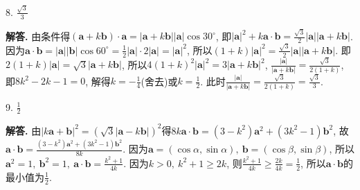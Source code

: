 \documentclass[12pt,a4paper,oneside]{ctexart}
\newenvironment{solution}{\par\noindent\textbf{解答. }}{\\\par}
\begin{document}
8. $ \frac{\sqrt{3}}{3} $
\begin{solution}
    由条件得$ (\boldsymbol{a}+k\boldsymbol{b})\cdot\boldsymbol{a}=|\boldsymbol{a}+k\boldsymbol{b}||\boldsymbol{a}|\cos 30^{\circ} $, 即$ |\boldsymbol{a}|^2+k\boldsymbol{a}\cdot\boldsymbol{b}=\frac{\sqrt{3}}{2}|\boldsymbol{a}||\boldsymbol{a}+k\boldsymbol{b}| $. 因为$ \boldsymbol{a}\cdot\boldsymbol{b}=|\boldsymbol{a}||\boldsymbol{b}|\cos 60^{\circ}=\frac{1}{2}|\boldsymbol{a}|\cdot 2|\boldsymbol{a}|=|\boldsymbol{a}|^2 $, 所以$ (1+k)|\boldsymbol{a}|^2=\frac{\sqrt{3}}{2}|\boldsymbol{a}||\boldsymbol{a}+k\boldsymbol{b}| $. 即$ 2(1+k)|\boldsymbol{a}|=\sqrt{3}|\boldsymbol{a}+k\boldsymbol{b}| $, 所以$ 4(1+k)^2|\boldsymbol{a}|^2=3|\boldsymbol{a}+k\boldsymbol{b}|^2 $, $ \frac{|\boldsymbol{a}|}{|\boldsymbol{a}+k\boldsymbol{b}|}=\frac{\sqrt{3}}{2(1+k)} $, 即$ 8k^2-2k-1=0 $, 解得$ k=-\frac{1}{4} $(舍去)或$ k=\frac{1}{2} $. 此时$ \frac{|\boldsymbol{a}|}{|\boldsymbol{a}+k\boldsymbol{b}|}=\frac{\sqrt{3}}{2(1+k)}=\frac{\sqrt{3}}{3} $.
\end{solution}

9. $ \frac{1}{2} $
\begin{solution}
    由$ |k\boldsymbol{a}+\boldsymbol{b}|^2=(\sqrt{3}|\boldsymbol{a}-k\boldsymbol{b}|)^2 $得$ 8k\boldsymbol{a}\cdot\boldsymbol{b}=(3-k^2)\boldsymbol{a}^2+(3k^2-1)\boldsymbol{b}^2 $, 故$ \boldsymbol{a}\cdot\boldsymbol{b}=\frac{(3-k^2)\boldsymbol{a}^2+(3k^2-1)\boldsymbol{b}^2}{8k} $. 因为$ \boldsymbol{a}=(\cos \alpha,\sin \alpha),\ \boldsymbol{b}=(\cos \beta,\sin \beta) $, 所以$ \boldsymbol{a}^2=1,\ \boldsymbol{b}^2=1,\ \boldsymbol{a}\cdot\boldsymbol{b}=\frac{k^2+1}{4k} $. 因为$ k>0,\ k^2+1\geqslant 2k $, 则$ \frac{k^2+1}{4k}\geqslant\frac{2k}{4k}=\frac{1}{2} $, 所以$ \boldsymbol{a}\cdot\boldsymbol{b} $的最小值为$ \frac{1}{2} $.
\end{solution}
\end{document}
